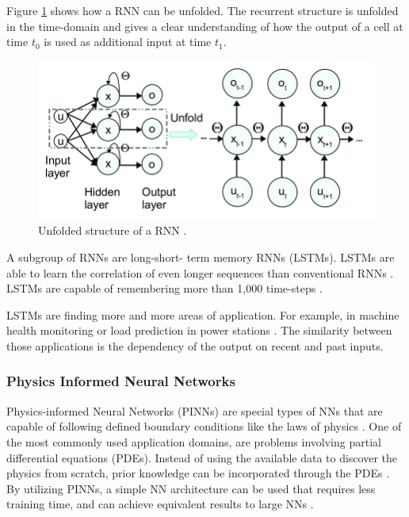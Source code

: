 Figure \ref{fig:rnn2} shows how a RNN can be unfolded. The recurrent structure is unfolded in the time-domain and gives a clear understanding of how the output of a cell at time \(t_0\) is used as additional input at time \(t_1\).

\begin{figure}[H]
	\centering
	\includegraphics[width=0.8\linewidth]{IMGs/RNN2.png}
	\caption{Unfolded structure of a RNN \cite{Guo}.}
	\label{fig:rnn2}
\end{figure}


A subgroup of RNNs are long-short- term memory RNNs (LSTMs). LSTMs are able to learn the correlation of even longer sequences than conventional RNNs \cite{Salehinejad}. LSTMs are capable of remembering more than 1,000 time-steps \cite{Staudemeyer}.

LSTMs are finding more and more areas of application. For example, in machine health monitoring or load prediction in power stations \cite{Zhao,Muzaffar}. The similarity between those applications is the dependency of the output on recent and past inputs. 

\subsubsection*{Physics Informed Neural Networks}
Physics-informed Neural Networks (PINNs) are special types of NNs that are capable of following defined boundary conditions like the laws of physics \cite{Cai}. One of the most commonly used application domains, are problems involving partial differential equations (PDEs). Instead of using the available data to discover the physics from scratch, prior knowledge can be incorporated through the PDEs \cite{Cuomo}. By utilizing PINNs, a simple NN architecture can be used that requires less training time, and can achieve equivalent results to large NNs \cite{Misyris}.

